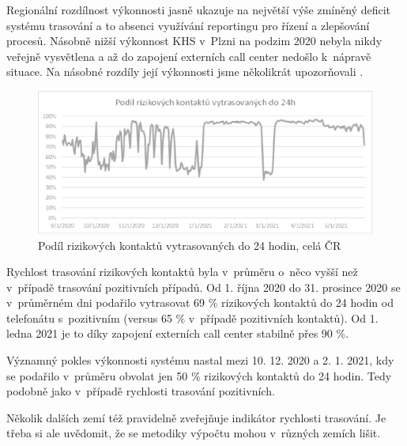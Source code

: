 Regionální rozdílnost výkonnosti jasně ukazuje na největší výše zmíněný deficit systému trasování a to absenci využívání reportingu pro řízení a zlepšování procesů. Násobně nižší výkonnost KHS v~Plzni na podzim 2020 nebyla nikdy veřejně vysvětlena a až do zapojení externích call center nedošlo k~nápravě situace. Na násobné rozdíly její výkonnosti jsme několikrát upozorňovali \cite{tr_bisop03}.

\begin{figure}[ht]
    \centering
    \includegraphics[width=1\textwidth]{./pic/d.eps}
    \caption{Podíl rizikových kontaktů vytrasovaných do 24 hodin, celá ČR}
    \label{fig:rizikove24}
\end{figure}

Rychlost trasování rizikových kontaktů byla v~průměru o~něco vyšší než v~případě trasování pozitivních případů. Od 1. října 2020 do 31. prosince 2020 se v~průměrném dni podařilo vytrasovat 69 \% rizikových kontaktů do 24 hodin od telefonátu s~pozitivním (versus 65 \% v~případě pozitivních kontaktů). Od 1. ledna 2021 je to díky zapojení externích call center stabilně přes 90 \%.

Významný pokles výkonnosti systému nastal mezi 10. 12. 2020 a 2. 1. 2021, kdy se podařilo v~průměru obvolat jen 50 \% rizikových kontaktů do 24 hodin. Tedy podobně jako v~případě rychlosti trasování pozitivních.

Několik dalších zemí též pravidelně zveřejňuje indikátor rychlosti trasování. Je třeba si ale uvědomit, že se metodiky výpočtu mohou v~různých zemích lišit.

